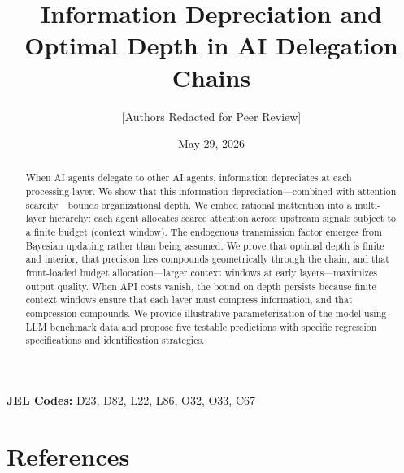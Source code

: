 \documentclass[12pt,a4paper]{article}
\title{\textbf{Information Depreciation and Optimal Depth in AI Delegation Chains}}
\author{[Authors Redacted for Peer Review]}
\date{May 29, 2026}
\begin{document}
\maketitle

\begin{abstract}
\noindent When AI agents delegate to other AI agents, information depreciates at each processing layer. We show that this information depreciation---combined with attention scarcity---bounds organizational depth. We embed rational inattention into a multi-layer hierarchy: each agent allocates scarce attention across upstream signals subject to a finite budget (context window). The endogenous transmission factor emerges from Bayesian updating rather than being assumed. We prove that optimal depth is finite and interior, that precision loss compounds geometrically through the chain, and that front-loaded budget allocation---larger context windows at early layers---maximizes output quality. When API costs vanish, the bound on depth persists because finite context windows ensure that each layer must compress information, and that compression compounds. We provide illustrative parameterization of the model using LLM benchmark data and propose five testable predictions with specific regression specifications and identification strategies.
\end{abstract}

\vspace{1em}
\noindent\textbf{JEL Codes:} D23, D82, L22, L86, O32, O33, C67

\vspace{2em}











\newpage
\appendix


\newpage
\section*{References}

\end{document}
